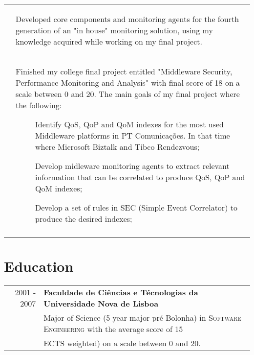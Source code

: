 \documentclass[a4paper,10pt]{article}
\begin{document}
\begin{tabular}{rp{11cm}}
   & \begin{compactitem}
   \item Developed core components and monitoring agents for the fourth generation of an "in house" monitoring solution, using my knowledge acquired while working on my final project.
   \end{compactitem}\vspace{-1em} \\
  & \begin{compactitem}
   \item Finished my college final project entitled "Middleware Security, Performance Monitoring and Analysis" with final score of 18 on a scale between 0 and 20.
   The main goals of my final project where the following: 
   \begin{description}
		\item[] Identify QoS, QoP and QoM indexes for the most used Middleware platforms in PT Comunicações. In that time where Microsoft Biztalk and Tibco Rendezvous;
   \end{description}
   \begin{description}
		\item[] Develop midleware monitoring agents to extract relevant information that can be correlated to produce QoS, QoP and QoM indexes;
   \end{description}
      \begin{description}
		\item[] Develop a set of rules in SEC (Simple Event Correlator) to produce the desired indexes;
   \end{description}
   \end{compactitem}\vspace{-1em} \\
\multicolumn{2}{c}{} \\

\end{tabular}

\section{Education}
\begin{tabular}{rl}	
2001 - 2007 & \textbf{Faculdade de Ciências e Técnologias da Universidade Nova de Lisboa}\\
 & Major of Science (5 year major pré-Bolonha) in \textsc{Software Engineering} with the average score of 15\\
 & ECTS weighted) on a scale between 0 and 20. \\
\end{tabular}
\end{document}
